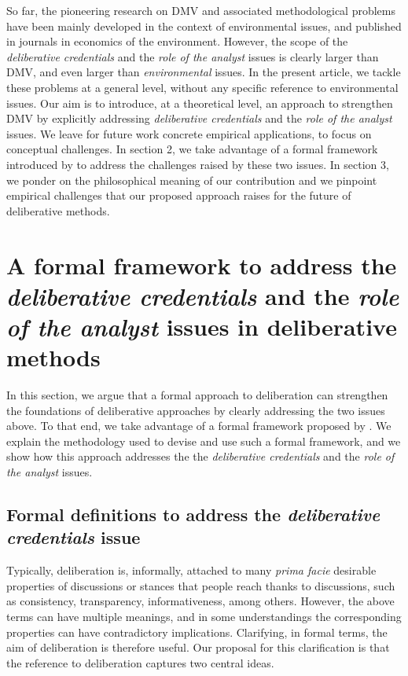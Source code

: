 \documentclass[version=3.21, pagesize, twoside=off, bibliography=totoc, DIV=calc, fontsize=12pt, a4paper, french, english]{scrartcl}
\begin{document}
So far, the pioneering research on \ac{DMV} and associated methodological problems have been mainly developed in the context of environmental issues, and published in journals in economics of the environment. However, the scope of the \emph{deliberative credentials} and the \emph{role of the analyst} issues is clearly larger than \ac{DMV}, and even larger than \emph{environmental} issues. In the present article, we tackle these problems at a general level, without any specific reference to environmental issues. Our aim is to introduce, at a theoretical level, an approach to strengthen \ac{DMV} by explicitly addressing \emph{deliberative credentials} and the \emph{role of the analyst} issues. We leave for future work concrete empirical applications, to focus on conceptual challenges. In section 2, we take advantage of a formal framework introduced by \citet{cailloux_formal_2019} to address the challenges raised by these two issues.
In section 3, we ponder on the philosophical meaning of our contribution and we pinpoint empirical challenges that our proposed approach raises for the future of deliberative methods.

\section{A formal framework to address the \emph{deliberative credentials} and the \emph{role of the analyst} issues in deliberative methods}
In this section, we argue that a formal approach to deliberation can strengthen the foundations of deliberative approaches by clearly addressing the two issues above. To that end, we take advantage of a formal framework proposed by \citet{cailloux_formal_2019}. We explain the methodology used to devise and use such a formal framework, and we show how this approach addresses the the \emph{deliberative credentials} and the \emph{role of the analyst} issues.

\subsection{Formal definitions to address the \emph{deliberative credentials} issue}

Typically, deliberation is, informally, attached to many \emph{prima facie} desirable properties of discussions or stances that people reach thanks to discussions, such as consistency, transparency, informativeness, among others. However, the above terms can have multiple meanings, and in some understandings the corresponding properties can have contradictory implications. Clarifying, in formal terms, the aim of deliberation is therefore useful. Our proposal for this clarification is that the reference to deliberation captures two central ideas.
\end{document}
